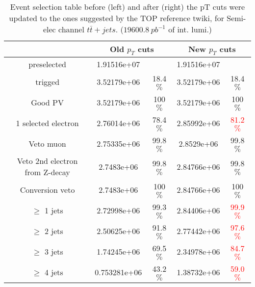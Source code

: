 \begin{table}
\caption{Event selection table before (left) and after (right) the pT cuts were updated to the ones suggested by the TOP reference twiki, for Semi-elec channel $t\bar{t}+jets$. ($19600.8~pb^{-1}$ of int. lumi.)}
\centering
\begin{tabular}{|c|c|c|c|c|}
\hline
				& \multicolumn{2}{|c|}{Old $p_T$ cuts}	& \multicolumn{2}{|c|}{New $p_T$ cuts}	\\
\hline
preselected			& 1.91516e+07	& 		 	& 1.91516e+07	&	 		\\

trigged				& 3.52179e+06	&	18.4 $\%$	& 3.52179e+06	&	18.4 $\%$	\\

Good PV				& 3.52179e+06	&	100 $\%$	& 3.52179e+06	&	100 $\%$	\\

1 selected electron		& 2.76014e+06	&	78.4 $\%$	& 2.85992e+06	&	\textcolor{red}{81.2 $\%$}	\\

Veto muon			& 2.75335e+06	&	99.8 $\%$	& 2.8529e+06	&	99.8 $\%$	\\

Veto 2nd electron from Z-decay	& 2.7483e+06	&	99.8 $\%$	& 2.84766e+06	&	99.8 $\%$	\\

Conversion veto			& 2.7483e+06	&	100 $\%$	& 2.84766e+06	&	100 $\%$	\\

$\geq$ 1 jets			& 2.72998e+06	&	99.3 $\%$	& 2.84406e+06	&	\textcolor{red}{99.9 $\%$}	\\

$\geq$ 2 jets			& 2.50625e+06	&	91.8 $\%$	& 2.77442e+06	&	\textcolor{red}{97.6 $\%$}	\\

$\geq$ 3 jets			& 1.74245e+06	&	69.5 $\%$	& 2.34978e+06	&	\textcolor{red}{84.7 $\%$}	\\

$\geq$ 4 jets			& 0.753281e+06	&	43.2 $\%$	& 1.38732e+06	&	\textcolor{red}{59.0 $\%$}	\\

\hline
\end{tabular}
\end{table}


